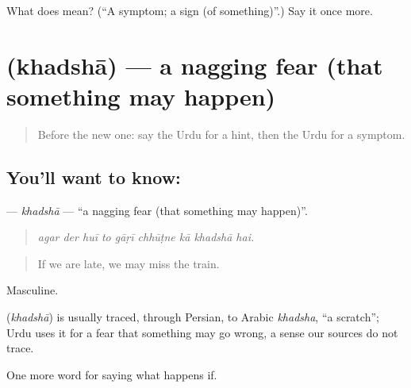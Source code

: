 \begin{tcolorbox}[breakable,colback=teal!4,colframe=teal!35!black,title={Before you move on}]
What does  mean? (\textquotedblleft{}A symptom; a sign (of something)\textquotedblright{}.) Say it once more.
\end{tcolorbox}
\section[\texorpdfstring{\ur{خدشہ} (khadshā)}{خدشہ (khadshā)}]{ (khadshā) — a nagging fear (that something may happen)}

\label{lesson:UR-C363-khadsha}



\begin{quote}
Before the new one: say the Urdu for a hint, then the Urdu for a symptom.
\end{quote}

\subsection*{You'll want to know: }
\textbf{} — \emph{khadshā} — \textquotedblleft{}a nagging fear (that something may happen)\textquotedblright{}.

\begin{quote}
        
\end{quote}

\begin{quote}
\emph{agar der huī to gāṛī chhūṭne kā khadshā hai.}
\end{quote}

\begin{quote}
If we are late, we may miss the train.
\end{quote}

Masculine.

\begin{cousinweb}
\textbf{} (\emph{khadshā}) is usually traced, through Persian, to Arabic \emph{khadsha}, \textquotedblleft{}a scratch\textquotedblright{}; Urdu uses it for a fear that something may go wrong, a sense our sources do not trace.
\end{cousinweb}

\begin{grammarlens}[title={What you've built}]
One more word for saying what happens if.
\end{grammarlens}

